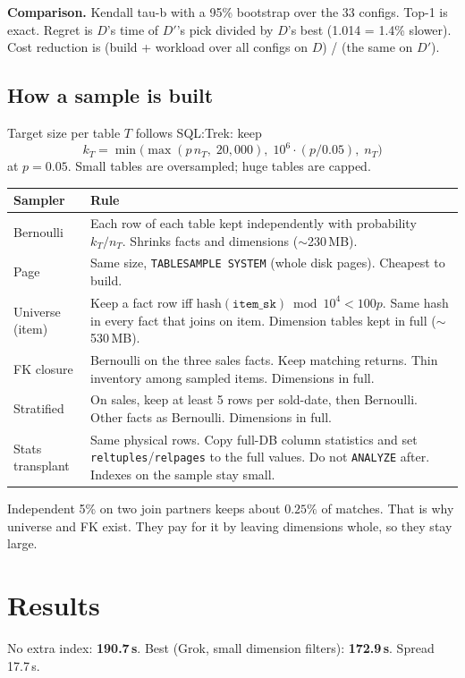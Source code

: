 \documentclass[11pt,a4paper]{article}
\begin{document}
\textbf{Comparison.} Kendall tau-b with a 95\% bootstrap over the 33 configs. Top-1 is exact. Regret is $D$'s time of $D'$'s pick divided by $D$'s best (1.014 = 1.4\% slower). Cost reduction is (build + workload over all configs on $D$) / (the same on $D'$).

\subsection{How a sample is built}

Target size per table $T$ follows SQL:Trek: keep
\[
k_T = \min\bigl(\max(p\,n_T,\; 20{,}000),\; 10^6\cdot(p/0.05),\; n_T\bigr)
\]
at $p=0.05$. Small tables are oversampled; huge tables are capped.

{\small
\begin{tabularx}{\textwidth}{@{}p{}L@{}}
\toprule
Sampler & Rule \\
\midrule
Bernoulli & Each row of each table kept independently with probability $k_T/n_T$. Shrinks facts and dimensions ($\sim$230\,MB). \\
Page & Same size, \texttt{TABLESAMPLE SYSTEM} (whole disk pages). Cheapest to build. \\
Universe (item) & Keep a fact row iff $\mathrm{hash}(\texttt{item\_sk})\bmod 10^4 < 100p$. Same hash in every fact that joins on item. Dimension tables kept in full ($\sim$530\,MB). \\
FK closure & Bernoulli on the three sales facts. Keep matching returns. Thin inventory among sampled items. Dimensions in full. \\
Stratified & On sales, keep at least 5 rows per sold-date, then Bernoulli. Other facts as Bernoulli. Dimensions in full. \\
Stats transplant & Same physical rows. Copy full-DB column statistics and set \texttt{reltuples}/\texttt{relpages} to the full values. Do not \texttt{ANALYZE} after. Indexes on the sample stay small. \\
\bottomrule
\end{tabularx}
}

Independent 5\% on two join partners keeps about $0.25\%$ of matches. That is why universe and FK exist. They pay for it by leaving dimensions whole, so they stay large.

\section{Results}

No extra index: \textbf{190.7\,s}. Best (Grok, small dimension filters): \textbf{172.9\,s}. Spread 17.7\,s.
\end{document}
